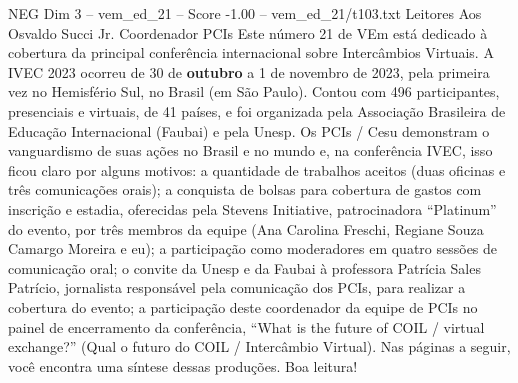 \begin{textsample}{NEG Dim 3 – vem\_ed\_21 – Score -1.00 – vem\_ed\_21/t103.txt}  \label{ex:f3_neg_036}
Leitores Aos Osvaldo Succi Jr.
Coordenador PCIs Este número 21 de VEm está dedicado à cobertura da principal conferência internacional sobre Intercâmbios Virtuais.
A IVEC 2023 ocorreu de 30 de \textbf{outubro} a 1 de novembro de 2023, pela primeira vez no Hemisfério Sul, no Brasil (em São Paulo).
Contou com 496 participantes, presenciais e virtuais, de 41 países, e foi organizada pela Associação Brasileira de Educação Internacional (Faubai) e pela Unesp.
Os PCIs / Cesu demonstram o vanguardismo de suas ações no Brasil e no mundo e, na conferência IVEC, isso ficou claro por alguns motivos: a quantidade de trabalhos aceitos (duas oficinas e três comunicações orais); a conquista de bolsas para cobertura de gastos com inscrição e estadia, oferecidas pela Stevens Initiative, patrocinadora “Platinum” do evento, por três membros da equipe (Ana Carolina Freschi, Regiane Souza Camargo Moreira e eu); a participação como moderadores em quatro sessões de comunicação oral; o convite da Unesp e da Faubai à professora Patrícia Sales Patrício, jornalista responsável pela comunicação dos PCIs, para realizar a cobertura do evento; a participação deste coordenador da equipe de PCIs no painel de encerramento da conferência, “What is the future of COIL / virtual exchange?” (Qual o futuro do COIL / Intercâmbio Virtual).
Nas páginas a seguir, você encontra uma síntese dessas produções.
Boa leitura!

\end{textsample}
